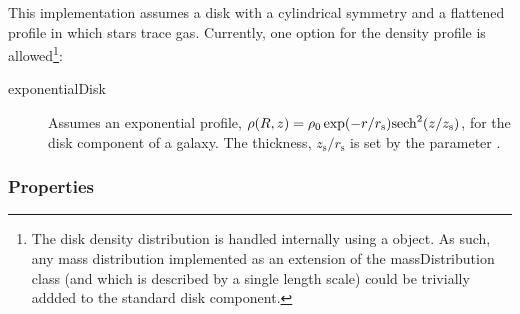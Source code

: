 This implementation assumes a disk with a cylindrical symmetry and a flattened profile in which stars trace gas. Currently, one option for the density profile is allowed\footnote{The disk density distribution is handled internally using a \protect{} object. As such, any mass distribution implemented as an extension of the {\normalfont \ttfamily massDistribution} class (and which is described by a single length scale) could be trivially addded to the standard disk component.}:
\begin{description}
\item [{\normalfont \ttfamily exponentialDisk}] Assumes an exponential profile, $\rho(R,z) = \rho_0 \exp(-r/r_\mathrm{s}) \hbox{sech}^2(z/z_\mathrm{s})$, for the disk \gls{component} of a galaxy. The thickness, $z_\mathrm{s}/r_\mathrm{s}$ is set by the parameter {\normalfont \ttfamily [heightToRadialScaleDisk]}.
\end{description}

\subsubsection{Properties}

